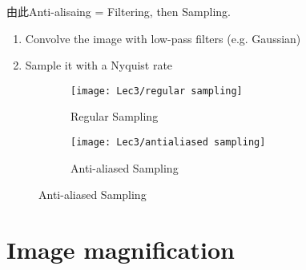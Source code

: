    由此Anti-alisaing = Filtering, then Sampling.
    \begin{enumerate}
        \item Convolve the image with low-pass filters (e.g. Gaussian)
        \item Sample it with a Nyquist rate
    \end{enumerate}
    \begin{figure}[H]
        \centering
        \begin{subfigure}{0.36\textwidth}
            \centering
            \texttt{[image: Lec3/regular sampling]}
            \caption{Regular Sampling}
        \end{subfigure}
        \begin{subfigure}{0.36\textwidth}
            \centering
            \texttt{[image: Lec3/antialiased sampling]}
            \caption{Anti-aliased Sampling}
        \end{subfigure}
    \end{figure}

\section{Image magnification}

